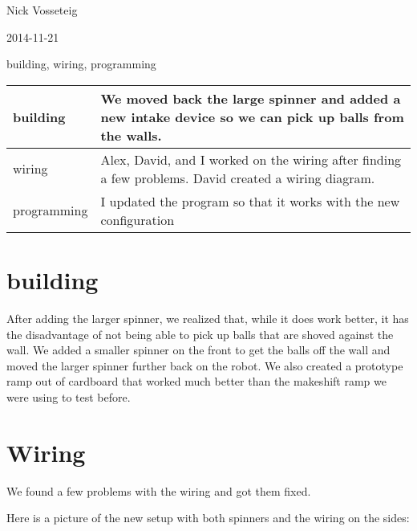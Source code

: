Nick Vosseteig

2014-11-21

building, wiring, programming

\begin{tabular}{|p{5cm}|p{5cm}|}
 \hline
 building&
We moved back the large spinner and added a new intake device so we can pick up balls from the walls.
 \\
 \hline
wiring&
Alex, David, and I worked on the wiring after finding a few problems. David created a wiring diagram.
 \\
 \hline
programming&
I updated the program so that it works with the new configuration
 \\
 \hline
\end{tabular}

\section*{building}
After adding the larger spinner, we realized that, while it does work better, it has the disadvantage of not being able to pick up balls that are shoved against the wall. We added a smaller spinner on the front to get the balls off the wall and moved the larger spinner further back on the robot. We also created a prototype ramp out of cardboard that worked much better than the makeshift ramp we were using to test before.
\section*{Wiring}
We found a few problems with the wiring and got them fixed.

Here is a picture of the new setup with both spinners and the wiring on the sides:
\begin{center}
\end{center}